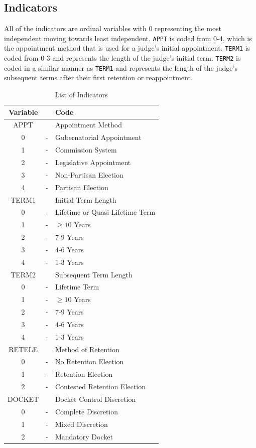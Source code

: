 \documentclass[12pt]{article}
\begin{document}
\subsection*{Indicators}
All of the indicators are ordinal variables with 0 representing the most independent moving towards least independent.  \texttt{APPT} is coded from 0-4, which is the appointment method that is used for a judge's initial appointment.  \texttt{TERM1} is coded from 0-3 and represents the length of the judge's initial term.  \texttt{TERM2} is coded in a similar manner as \texttt{TERM1} and represents the length of the judge's subsequent terms after their first retention or reappointment. 
\begin{table}[!htb]\singlespacing\centering
	\caption{List of Indicators}\label{Indicators}
	
	\begin{tabular}{ccl}\hline
		\textbf{Variable}	&		&	\textbf{Code}	\\\hline\hline
		APPT	&		&	Appointment Method	\\
		0	&	-	&	Gubernatorial Appointment	\\
		1	&	-	&	Commission System	\\
		2	&	-	&	Legislative Appointment	\\
		3	&	-	&	Non-Partisan Election	\\
		4	&	-	&	Partisan Election	\\\hline
		TERM1	&		&	Initial Term Length	\\
		0	&	-	&	Lifetime or Quasi-Lifetime Term\\
		1	&	-	&	$\geq10$ Years	\\
		2	&	-	&	7-9 Years	\\
		3	&	-	&	4-6 Years	\\
		4	&	-	&	1-3 Years	\\\hline
		TERM2	&		&	Subsequent Term Length	\\
		0	&	-	&	Lifetime Term	\\
		1   &   -   &   $\geq10$ Years \\
		2	&	-	&	7-9 Years	\\
		3	&	-	&	4-6 Years	\\
		4	&	-	&	1-3 Years	\\\hline
		RETELE	&		&	Method of Retention	\\
		0	&	-	&	No Retention Election	\\
		1	&	-	&	Retention Election	\\
		2	&	-	&	Contested Retention Election	\\\hline
		DOCKET	&		&	Docket Control Discretion	\\
		0	&	-	&	Complete Discretion	\\
		1	&	-	&	Mixed Discretion	\\
		2	&	-	&	Mandatory Docket	\\\hline
	\end{tabular}
	
\end{table}
\end{document}
